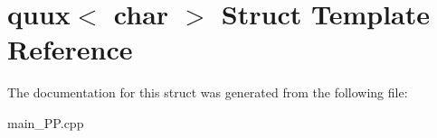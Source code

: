 \hypertarget{structquux_3_01char_01_4}{\section{quux$<$ char $>$ Struct Template Reference}
\label{structquux_3_01char_01_4}
}


The documentation for this struct was generated from the following file\+:\begin{DoxyCompactItemize}
\item 
main\+\_\+\+P\+P.\+cpp\end{DoxyCompactItemize}
